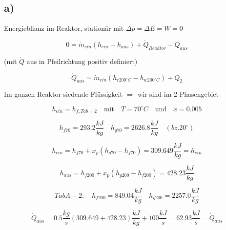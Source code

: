 

\subsection*{a)}
Energieblianz im Reaktor, stationär mit $\Delta p = \Delta E = W = 0$

\[
0 = \dot{m}_{ein} (h_{ein} - h_{aus}) + \dot{Q}_{Reaktor} - \dot{Q}_{aus}
\]

(mit $\dot{Q}$ aus in Pfeilrichtung positiv definiert)

\[
\dot{Q}_{aus} = \dot{m}_{ein} (h_{r200^\circ C} - h_{w200^\circ C}) + Q_2
\]

Im ganzen Reaktor siedende Flüssigkeit $\Rightarrow$ wir sind im 2-Phasengebiet

\[
h_{ein} = h_{f, Tab = 2} \quad \text{mit} \quad T = 70^\circ C \quad \text{und} \quad x = 0.005
\]

\[
h_{f70} = 293.2 \frac{kJ}{kg} \quad h_{g70} = 2626.8 \frac{kJ}{kg} \quad (bz. 20^\circ)
\]

\[
h_{ein} = h_{f70} + x_p (h_{g70} - h_{f70}) = 309.649 \frac{kJ}{kg} = h_{ein}
\]

\[
h_{aus} = h_{f200} + x_p (h_{g200} - h_{f200}) = 428.23 \frac{kJ}{kg}
\]

\[
Tab A-2: \quad h_{f200} = 849.04 \frac{kJ}{kg} \quad h_{g200} = 2257.0 \frac{kJ}{kg}
\]

\[
\dot{Q}_{aus} = 0.5 \frac{kg}{s} (309.649 + 428.23) \frac{kJ}{kg} + 100 \frac{kJ}{s} = 62.93 \frac{kJ}{s} = \dot{Q}_{aus}
\]